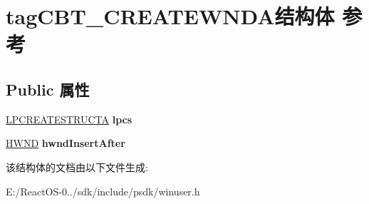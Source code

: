 \hypertarget{structtag_c_b_t___c_r_e_a_t_e_w_n_d_a}{}\section{tag\+C\+B\+T\+\_\+\+C\+R\+E\+A\+T\+E\+W\+N\+D\+A结构体 参考}
\label{structtag_c_b_t___c_r_e_a_t_e_w_n_d_a}
\subsection*{Public 属性}
\begin{DoxyCompactItemize}
\item 
\mbox{\label{structtag_c_b_t___c_r_e_a_t_e_w_n_d_a_a5cd6701d12cdc79f7bda5cf7d8049d08}} 
\hyperlink{structtag_c_r_e_a_t_e_s_t_r_u_c_t_a}{L\+P\+C\+R\+E\+A\+T\+E\+S\+T\+R\+U\+C\+TA} {\bfseries lpcs}
\item 
\mbox{\label{structtag_c_b_t___c_r_e_a_t_e_w_n_d_a_a9e8616bf7bef5f1a66543743c148da29}} 
\hyperlink{interfacevoid}{H\+W\+ND} {\bfseries hwnd\+Insert\+After}
\end{DoxyCompactItemize}


该结构体的文档由以下文件生成\+:\begin{DoxyCompactItemize}
\item 
E\+:/\+React\+O\+S-\/0../sdk/include/psdk/winuser.\+h\end{DoxyCompactItemize}
